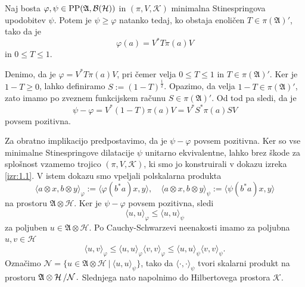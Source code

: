 \begin{trditev} \label{trd:1.4}
    Naj bosta $\varphi, \psi \in \operatorname{PP}(\mathfrak{A},\operatorname{\mathcal{B} (\mathcal{H})})$ in
    $(\pi, V, \mathcal{K})$ minimalna Stinespringova upodobitev $\psi$.
    Potem je $\psi \geq \varphi$ natanko tedaj, ko obstaja enoličen $T \in \pi(\mathfrak{A})'$,
    tako da je
    $$\varphi(a) = V^* T \pi(a) V$$ in $0 \leq T \leq 1$.
\end{trditev}

\begin{dokaz}
    Denimo, da je $\varphi = V^* T \pi(a) V$, pri čemer velja $0 \leq T \leq 1$ in $T \in \pi(\mathfrak{A})'$.
    Ker je $1 - T \geq 0$, lahko definiramo $S := (1 - T)^{\frac{1}{2}}$. 
    Opazimo, da velja $1 - T \in \pi(\mathfrak{A})'$, zato imamo po zveznem funkcijskem računu $S \in \pi(\mathfrak{A})'$.
    Od tod pa sledi, da je $$\psi - \varphi = V^* (1 - T) \pi(a) V = V^* S^* \pi(a) S V$$
    povsem pozitivna.
    
    Za obratno implikacijo predpostavimo, da je $\psi - \varphi$ povsem pozitivna.
    Ker so vse minimalne Stinespringove dilatacije $\psi$ unitarno ekvivalentne, lahko brez škode za splošnost vzamemo trojico $(\pi, V, \mathcal{K})$,
    ki smo jo konstruirali v dokazu izreka \ref{izr:1.1}.
    V istem dokazu smo vpeljali polskalarna produkta 
    $$\langle a \otimes x, b \otimes y \rangle_{\varphi} := \langle \varphi(b^* a) x, y\rangle,\quad \langle a \otimes x, b \otimes y \rangle_{\psi} := \langle \psi(b^* a) x, y\rangle$$
    na prostoru $\mathfrak{A} \otimes \mathcal{H}$.
    Ker je $\psi - \varphi$ povsem pozitivna, sledi $$\langle u, u \rangle_{\varphi} \leq \langle u, u \rangle_{\psi}$$
    za poljuben $u \in \mathfrak{A} \otimes \mathcal{H}$. Po Cauchy-Schwarzevi neenakosti imamo za poljubna $u, v \in \mathcal{H}$
    \begin{equation}
        \langle u, v\rangle_{\varphi} \leq \langle u, u\rangle_{\varphi} \langle v, v \rangle_{\varphi} \leq \langle u, u\rangle_{\psi} \langle v, v \rangle_{\psi}. \label{eq:1.5}
    \end{equation} 
    Označimo $\mathcal{N} = \{u \in \mathfrak{A} \otimes \mathcal{H}\ |\ \langle u, u \rangle_{\psi}\}$, tako da $\langle \cdot, \cdot \rangle_{\psi}$ tvori skalarni produkt na prostoru $\quot{\mathfrak{A} \otimes \mathcal{H}}{\mathcal{N}}.$
    Slednjega nato napolnimo do Hilbertovega prostora $\mathcal{K}$.


\end{dokaz}
